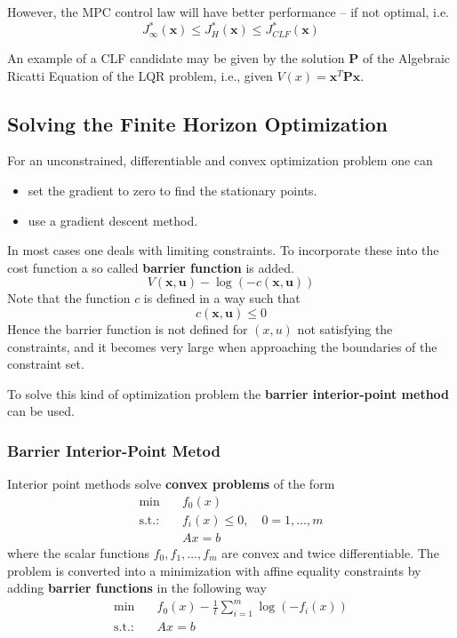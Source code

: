 However, the MPC control law will have better performance -- if not optimal, i.e. %
\begin{equation*}
    J^*_\infty(\mathbf{x}) \leq J^*_H(\mathbf{x}) \leq J^*_{CLF}(\mathbf{x})
\end{equation*}

An example of a CLF candidate may be given by the solution $\mathbf{P}$ of the Algebraic Ricatti Equation of the LQR problem, i.e., given $V(x) = \mathbf{x}^T \mathbf{Px}$.

\subsection{Solving the Finite Horizon Optimization}

For an unconstrained, differentiable and convex optimization problem one can
\begin{itemize}
    \item set the gradient to zero to find the stationary points.
    \item use a gradient descent method.
\end{itemize}

In most cases one deals with limiting constraints. To incorporate these into the cost function a so called \textbf{barrier function} is added.
\begin{equation*}
    V(\mathbf{x,u}) - \log(-c(\mathbf{x,u}))
\end{equation*}
Note that the function $c$ is defined in a way such that
\begin{equation*}
    c(\mathbf{x,u}) \leq 0
\end{equation*}
Hence the barrier function is not defined for $(x,u)$ not satisfying the constraints, and it becomes very large when approaching the boundaries of the constraint set.

To solve this kind of optimization problem the \textbf{barrier interior-point method} can be used.

\subsubsection{Barrier Interior-Point Metod}
Interior point methods solve \textbf{convex problems} of the form
\begin{align*}
    \min \quad         & f_0(x)                                 \\
    \text{s.t.:} \quad & f_i(x) \leq 0 , \quad 0 = 1, \ldots, m \\
                       & Ax = b
\end{align*}
where the scalar functions $f_0,f_1,\ldots,f_m$ are convex and twice differentiable.
\newpar{}
The problem is converted into a minimization with affine equality constraints by adding \textbf{barrier functions} in the following way
\begin{align*}
    \min \quad        & f_0(x) - \frac{1}{t}\sum_{i=1}^{m}\log(-f_i(x)) \\
    \text{s.t.:}\quad & Ax=b
\end{align*}

